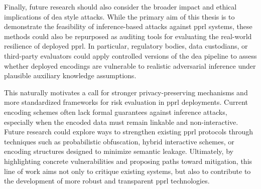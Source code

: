 Finally, future research should also consider the broader impact and ethical implications of \ac{dea} style attacks.
While the primary aim of this thesis is to demonstrate the feasibility of inference-based attacks against \ac{pprl} systems, these methods could also be repurposed as auditing tools for evaluating the real-world resilience of deployed \ac{pprl}.
In particular, regulatory bodies, data custodians, or third-party evaluators could apply controlled versions of the \ac{dea} pipeline to assess whether deployed encodings are vulnerable to realistic adversarial inference under plausible auxiliary knowledge assumptions.

This naturally motivates a call for stronger privacy-preserving mechanisms and more standardized frameworks for risk evaluation in \ac{pprl} deployments.
Current encoding schemes often lack formal guarantees against inference attacks, especially when the encoded data must remain linkable and non-interactive.
Future research could explore ways to strengthen existing \ac{pprl} protocols through techniques such as probabilistic obfuscation, hybrid interactive schemes, or encoding structures designed to minimize semantic leakage.
Ultimately, by highlighting concrete vulnerabilities and proposing paths toward mitigation, this line of work aims not only to critique existing systems, but also to contribute to the development of more robust and transparent \ac{pprl} technologies.

